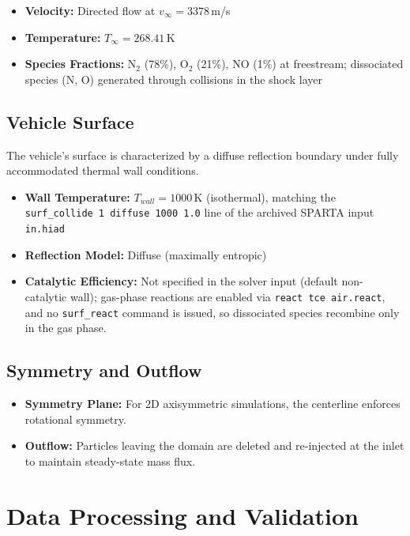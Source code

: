 \begin{itemize}
    \item \textbf{Velocity:} Directed flow at $v_{\infty} = 3378$\,m/s

    \item \textbf{Temperature:} $T_{\infty} = 268.41$\,K
    \item \textbf{Species Fractions:} N$_2$ (78\%), O$_2$ (21\%), NO (1\%) at freestream; dissociated species (N, O) generated through collisions in the shock layer
\end{itemize}

\subsection{Vehicle Surface}
The vehicle's surface is characterized by a diffuse reflection boundary under fully accommodated thermal wall conditions.
\begin{itemize}
    \item \textbf{Wall Temperature:} $T_{wall} = 1000$\,K (isothermal), matching the \texttt{surf\_collide 1 diffuse 1000 1.0} line of the archived SPARTA input \texttt{in.hiad}

    \item \textbf{Reflection Model:} Diffuse (maximally entropic)

    \item \textbf{Catalytic Efficiency:} Not specified in the solver input (default non-catalytic wall); gas-phase reactions are enabled via \texttt{react tce air.react}, and no \texttt{surf\_react} command is issued, so dissociated species recombine only in the gas phase.
\end{itemize}

\subsection{Symmetry and Outflow}
\begin{itemize}
    \item \textbf{Symmetry Plane:} For 2D axisymmetric simulations, the centerline enforces rotational symmetry.

    \item \textbf{Outflow:} Particles leaving the domain are deleted and re-injected at the inlet to maintain steady-state mass flux.
\end{itemize}

\section{Data Processing and Validation}

